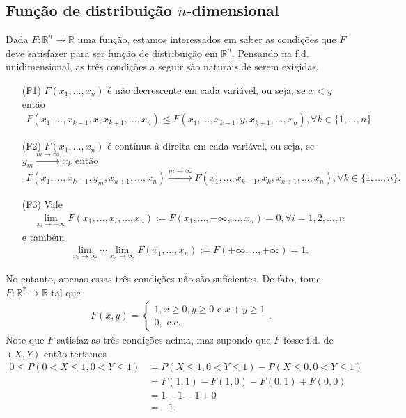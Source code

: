 \documentclass[../Notas.tex]{subfiles}
\begin{document}
\subsection{Função de distribuição \texorpdfstring{$n$}{n}-dimensional}
Dada $F:\mathbb{R}^n\to\mathbb{R}$ uma função, estamos interessados em saber as condições que $F$ deve satisfazer para ser função de distribuição em $\mathbb{R}^n$. Pensando na f.d. unidimensional, as três condições a seguir são naturais de serem exigidas.
\begin{itemize}
    \item[(F1)] $F(x_1, \dots, x_n)$ é não decrescente em cada variável, ou seja, se $x<y$ então
    \begin{align*}
        F(x_1, \dots, x_{k-1}, x, x_{k+1}, \dots, x_n) \leq F(x_1, \dots, x_{k-1}, y, x_{k+1}, \dots, x_n), \forall k\in\{1,\dots, n\}.
    \end{align*}
    \item[(F2)] $F(x_1, \dots, x_n)$ é contínua à direita em cada variável, ou seja, se $y_m\xrightarrow{m\to\infty} x_k$ então
    \begin{align*}
        F(x_1, \dots, x_{k-1}, y_m, x_{k+1}, \dots, x_n) \xrightarrow{m\to\infty} F(x_1, \dots, x_{k-1}, x_k, x_{k+1}, \dots, x_n), \forall k\in\{1, \dots, n\}.
    \end{align*}
    \item[(F3)] Vale
    \begin{align*}
        \lim_{x_i\to -\infty} F(x_1, \dots, x_i, \dots, x_n) := F(x_1, \dots, -\infty, \dots, x_n) = 0, \forall i = 1,2, \dots, n
    \end{align*}
    e também
    \begin{align*}
        \lim_{x_1\to \infty}\cdots\lim_{x_n\to \infty} F(x_1, \dots, x_n) := F(+\infty, \dots, +\infty) = 1.
    \end{align*}
\end{itemize}
No entanto, apenas essas três condições não são suficientes. De fato, tome $F:\mathbb{R}^2\to\mathbb{R}$ tal que
\begin{align*}
    F(x,y) = \begin{cases}
    1, x\geq 0, y\geq 0 \text{ e } x+y\geq 1 \\
    0, \text{ c.c.}
    \end{cases}.
\end{align*}
Note que $F$ satisfaz as três condições acima, mas supondo que $F$ fosse f.d. de $(X,Y)$ então teríamos
\begin{align*}
    0\leq P(0 < X\leq 1, 0 < Y\leq 1) &= P(X\leq 1, 0 < Y\leq 1) - P(X\leq 0, 0 < Y\leq 1) \\
    &= F(1,1) - F(1,0) - F(0,1) + F(0,0) \\
    &= 1 - 1 - 1 + 0 \\
    &= -1,
\end{align*}
\end{document}
